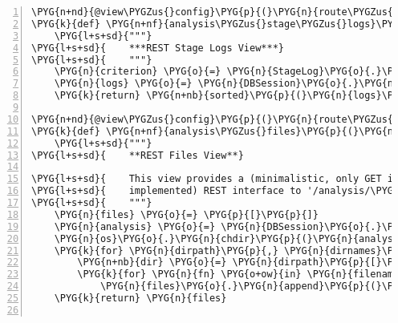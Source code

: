 \begin{Verbatim}[commandchars=\\\{\},numbers=left,firstnumber=1,stepnumber=5]
\PYG{n+nd}{@view\PYGZus{}config}\PYG{p}{(}\PYG{n}{route\PYGZus{}name}\PYG{o}{=}\PYG{l+s}{'}\PYG{l+s}{analysis\PYGZus{}logs\PYGZus{}rest}\PYG{l+s}{'}\PYG{p}{,} \PYG{n}{renderer}\PYG{o}{=}\PYG{l+s}{'}\PYG{l+s}{jsonx}\PYG{l+s}{'}\PYG{p}{)}
\PYG{k}{def} \PYG{n+nf}{analysis\PYGZus{}stage\PYGZus{}logs}\PYG{p}{(}\PYG{n}{request}\PYG{p}{)}\PYG{p}{:}
    \PYG{l+s+sd}{"""}
\PYG{l+s+sd}{    ***REST Stage Logs View***}
\PYG{l+s+sd}{    """}
    \PYG{n}{criterion} \PYG{o}{=} \PYG{n}{StageLog}\PYG{o}{.}\PYG{n}{analysis\PYGZus{}id} \PYG{o}{==} \PYG{n+nb}{int}\PYG{p}{(}\PYG{n}{request}\PYG{o}{.}\PYG{n}{matchdict}\PYG{p}{[}\PYG{l+s}{"}\PYG{l+s}{id}\PYG{l+s}{"}\PYG{p}{]}\PYG{p}{)}
    \PYG{n}{logs} \PYG{o}{=} \PYG{n}{DBSession}\PYG{o}{.}\PYG{n}{query}\PYG{p}{(}\PYG{n}{StageLog}\PYG{p}{)}\PYG{o}{.}\PYG{n}{filter}\PYG{p}{(}\PYG{n}{criterion}\PYG{p}{)}\PYG{o}{.}\PYG{n}{all}\PYG{p}{(}\PYG{p}{)}
    \PYG{k}{return} \PYG{n+nb}{sorted}\PYG{p}{(}\PYG{n}{logs}\PYG{p}{,} \PYG{n}{key}\PYG{o}{=}\PYG{k}{lambda} \PYG{n}{log}\PYG{p}{:} \PYG{n}{log}\PYG{o}{.}\PYG{n}{id}\PYG{p}{)}

\PYG{n+nd}{@view\PYGZus{}config}\PYG{p}{(}\PYG{n}{route\PYGZus{}name}\PYG{o}{=}\PYG{l+s}{'}\PYG{l+s}{analysis\PYGZus{}files\PYGZus{}rest}\PYG{l+s}{'}\PYG{p}{,} \PYG{n}{renderer}\PYG{o}{=}\PYG{l+s}{'}\PYG{l+s}{jsonx}\PYG{l+s}{'}\PYG{p}{)}
\PYG{k}{def} \PYG{n+nf}{analysis\PYGZus{}files}\PYG{p}{(}\PYG{n}{request}\PYG{p}{)}\PYG{p}{:}
    \PYG{l+s+sd}{"""}
\PYG{l+s+sd}{    **REST Files View**}

\PYG{l+s+sd}{    This view provides a (minimalistic, only GET is}
\PYG{l+s+sd}{    implemented) REST interface to '/analysis/\PYGZob{}id\PYGZcb{}/files'.}
\PYG{l+s+sd}{    """}
    \PYG{n}{files} \PYG{o}{=} \PYG{p}{[}\PYG{p}{]}
    \PYG{n}{analysis} \PYG{o}{=} \PYG{n}{DBSession}\PYG{o}{.}\PYG{n}{query}\PYG{p}{(}\PYG{n}{Analysis}\PYG{p}{)}\PYG{o}{.}\PYG{n}{get}\PYG{p}{(}\PYG{n+nb}{int}\PYG{p}{(}\PYG{n}{request}\PYG{o}{.}\PYG{n}{matchdict}\PYG{p}{[}\PYG{l+s}{"}\PYG{l+s}{id}\PYG{l+s}{"}\PYG{p}{]}\PYG{p}{)}\PYG{p}{)}
    \PYG{n}{os}\PYG{o}{.}\PYG{n}{chdir}\PYG{p}{(}\PYG{n}{analysis}\PYG{o}{.}\PYG{n}{data\PYGZus{}dir}\PYG{p}{)}
    \PYG{k}{for} \PYG{n}{dirpath}\PYG{p}{,} \PYG{n}{dirnames}\PYG{p}{,} \PYG{n}{filenames} \PYG{o+ow}{in} \PYG{n}{os}\PYG{o}{.}\PYG{n}{walk}\PYG{p}{(}\PYG{l+s}{"}\PYG{l+s}{.}\PYG{l+s}{"}\PYG{p}{)}\PYG{p}{:}
        \PYG{n+nb}{dir} \PYG{o}{=} \PYG{n}{dirpath}\PYG{p}{[}\PYG{l+m+mi}{2}\PYG{p}{:}\PYG{p}{]}
        \PYG{k}{for} \PYG{n}{fn} \PYG{o+ow}{in} \PYG{n}{filenames}\PYG{p}{:}
            \PYG{n}{files}\PYG{o}{.}\PYG{n}{append}\PYG{p}{(}\PYG{p}{\PYGZob{}}\PYG{l+s}{'}\PYG{l+s}{path}\PYG{l+s}{'}\PYG{p}{:} \PYG{n}{os}\PYG{o}{.}\PYG{n}{path}\PYG{o}{.}\PYG{n}{join}\PYG{p}{(}\PYG{n+nb}{dir}\PYG{p}{,} \PYG{n}{fn}\PYG{p}{)}\PYG{p}{\PYGZcb{}}\PYG{p}{)}
    \PYG{k}{return} \PYG{n}{files}


\end{Verbatim}
